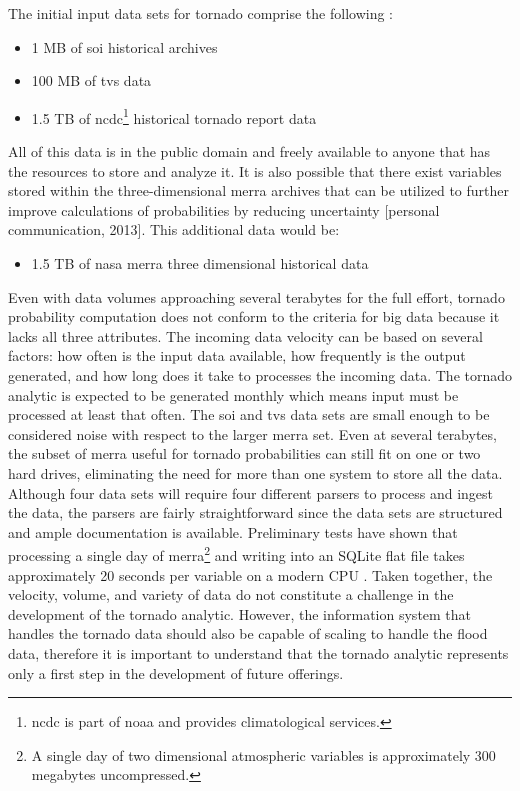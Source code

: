 The initial input data sets for tornado comprise the following \cite{walker}:
\begin{itemize}
    \item 1 MB of \gls{soi} historical archives \cite{bom}
    \item 100 MB of \gls{tvs} data \cite{hdss}
    \item 1.5 TB of \gls{ncdc}\footnote{\gls{ncdc} is part of \gls{noaa} and provides climatological services.} historical tornado report data \cite{ncdc}
\end{itemize}
All of this data is in the public domain and freely available to anyone that has the resources to store and analyze it. It is also possible that there exist variables stored within the three-dimensional \gls{merra} archives that can be utilized to further improve calculations of probabilities by reducing uncertainty [personal communication, 2013]. This additional data would be:
\begin{itemize}
    \item 1.5 TB of \gls{nasa} \gls{merra} three dimensional historical data \cite{mdisc}
\end{itemize}
Even with data volumes approaching several terabytes for the full effort, tornado probability computation does not conform to the criteria for big data because it lacks all three attributes. The incoming data velocity can be based on several factors: how often is the input data available, how frequently is the output generated, and how long does it take to processes the incoming data. The tornado analytic is expected to be generated monthly which means input must be processed at least that often. The \gls{soi} and \gls{tvs} data sets are small enough to be considered noise with respect to the larger \gls{merra} set. Even at several terabytes, the subset of \gls{merra} useful for tornado probabilities can still fit on one or two hard drives, eliminating the need for more than one system to store all the data.  Although four data sets will require four different parsers to process and ingest the data, the parsers are fairly straightforward since the data sets are structured and ample documentation is available. Preliminary tests have shown that processing a single day of \gls{merra}\footnote{A single day of two dimensional atmospheric variables is approximately 300 megabytes uncompressed.} and writing into an SQLite flat file takes approximately 20 seconds per variable on a modern CPU \cite{keller1}. Taken together, the velocity, volume, and variety of data do not constitute a challenge in the development of the tornado analytic. However, the information system that handles the tornado data should also be capable of scaling to handle the flood data, therefore it is important to understand that the tornado analytic represents only a first step in the development of future offerings.\\

